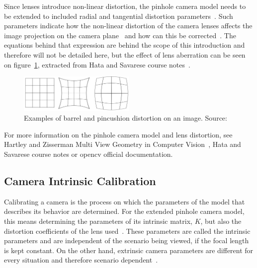 Since lenses introduce non-linear distortion, the pinhole camera model needs to be extended to included radial and tangential distortion parameters~\cite{Bouguet2010, manuapphotogrammetry, Heikkila1997}. Such parameters indicate how the non-linear distortion of the camera lenses affects the image projection on the camera plane~\cite{camera_models, Sturm2010} and how can this be corrected~\cite{Heikkila1997, Bouguet2010, opencv_doc}. The equations behind that expression are behind the scope of this introduction and therefore will not be detailed here, but the effect of lens aberration can be seen on figure~\ref{fig:lense_distortion_types}, extracted from Hata and Savarese course notes~\cite{camera_models}.

\begin{figure}[h]
	\centering
	\includegraphics[width=0.5\textwidth]{img/camera/distortion.png}
	\caption{Examples of barrel and pincushion distortion on an image. Source: \cite{camera_models}}
	\label{fig:lense_distortion_types}
\end{figure}

For more information on the pinhole camera model and lens distortion, see Hartley and Zisserman Multi View Geometry in Computer Vision~\cite{mvg_book}, Hata and Savarese course notes\cite{camera_models} or \acf{opencv} official documentation\cite{opencv_doc}. 

\subsection{Camera Intrinsic Calibration}
\label{subsec:sota:camera-intrinisc-calibration}
Calibrating a camera is the process on which the parameters of the model that describes its behavior are determined. For the extended pinhole camera model, this means determining the parameters of its intrinsic matrix, $K$, but also the distortion coefficients of the lens used~\cite{mvg_book, camera_models, Bouguet2010, Heikkila1997}. These parameters are called the intrinsic parameters and are independent of the scenario being viewed, if the focal length is kept constant. On the other hand, extrinsic camera parameters are different for every situation and therefore scenario dependent~\cite{opencv_doc, Bouguet2010, Heikkila1997}.

